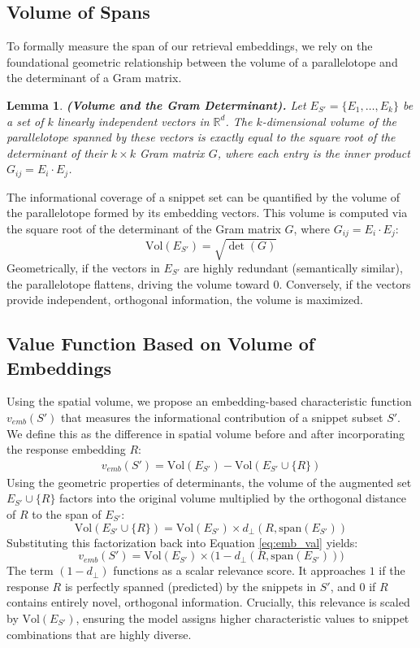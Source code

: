 \documentclass{article}
\newtheorem{lemma}[theorem]{Lemma}
\begin{document}
\subsection{Volume of Spans}

To formally measure the span of our retrieval embeddings, we rely on the foundational geometric relationship between the volume of a parallelotope and the determinant of a Gram matrix.

\begin{lemma}\label{lemma:vol_det}
\textbf{(Volume and the Gram Determinant).} 
Let $E_{S'} = \{E_1, \dots, E_k\}$ be a set of $k$ linearly independent vectors in $\mathbb{R}^d$. The $k$-dimensional volume of the parallelotope spanned by these vectors is exactly equal to the square root of the determinant of their $k \times k$ Gram matrix $G$, where each entry is the inner product $G_{ij} = E_i \cdot E_j$.
\end{lemma}


The informational coverage of a snippet set can be quantified by the volume of the parallelotope formed by its embedding vectors. This volume is computed via the square root of the determinant of the Gram matrix $G$, where $G_{ij} = E_i \cdot E_j$:
$$ \text{Vol}(E_{S'}) = \sqrt{\det(G)} $$
Geometrically, if the vectors in $E_{S'}$ are highly redundant (semantically similar), the parallelotope flattens, driving the volume toward $0$. Conversely, if the vectors provide independent, orthogonal information, the volume is maximized.



\subsection{Value Function Based on Volume of Embeddings}

Using the spatial volume, we propose an embedding-based characteristic function $v_{emb}(S')$ that measures the informational contribution of a snippet subset $S'$. We define this as the difference in spatial volume before and after incorporating the response embedding $R$:
\begin{align} \label{eq:emb_val}
v_{emb}(S') = \text{Vol}(E_{S'}) - \text{Vol}(E_{S'} \cup \{R\})
\end{align}
Using the geometric properties of determinants, the volume of the augmented set $E_{S'} \cup \{R\}$ factors into the original volume multiplied by the orthogonal distance of $R$ to the span of $E_{S'}$:
$$ \text{Vol}(E_{S'} \cup \{R\}) = \text{Vol}(E_{S'}) \times d_{\perp}(R, \text{span}(E_{S'})) $$
Substituting this factorization back into Equation \ref{eq:emb_val} yields:
$$ v_{emb}(S') = \text{Vol}(E_{S'}) \times \big(1 - d_{\perp}(R, \text{span}(E_{S'}))\big) $$
The term $(1 - d_{\perp})$ functions as a scalar relevance score. It approaches $1$ if the response $R$ is perfectly spanned (predicted) by the snippets in $S'$, and $0$ if $R$ contains entirely novel, orthogonal information. Crucially, this relevance is scaled by $\text{Vol}(E_{S'})$, ensuring the model assigns higher characteristic values to snippet combinations that are highly diverse.
\end{document}
